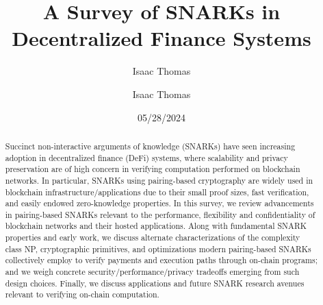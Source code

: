 \documentclass[envcountsame,runningheads,notitlepage]{llncs}
\title{A Survey of SNARKs in Decentralized Finance Systems}
\date{05/28/2024}
\author{
  Isaac Thomas\inst{1}
}%
\institute{Computer Science \& Engineering, UC San Diego\\
  \href{mailto:isthomas@ucsd.edu}{isthomas@ucsd.edu}
}  %
\author{Isaac Thomas}
\institute{University of California, San Diego}
\begin{document}
  \small  
  \maketitle

\begin{abstract}
Succinct non-interactive arguments of knowledge (SNARKs) have seen increasing adoption in decentralized finance (DeFi) systems, where scalability and privacy preservation are of high concern in verifying computation performed on blockchain networks. In particular, SNARKs using pairing-based cryptography are widely used in blockchain infrastructure/applications due to their small proof sizes, fast verification, and easily endowed zero-knowledge properties. In this survey, we review advancements in pairing-based SNARKs relevant to the performance, flexibility and confidentiality of blockchain networks and their hosted applications. Along with fundamental SNARK properties and early work, we discuss alternate characterizations of the complexity class NP, cryptographic primitives, and optimizations modern pairing-based SNARKs collectively employ to verify payments and execution paths through on-chain programs; and we weigh concrete security/performance/privacy tradeoffs emerging from such design choices. Finally, we discuss applications and future SNARK research avenues relevant to verifying on-chain computation.
\end{abstract}







\newpage
\ifnum{}
  
 \else
   
 \fi

\end{document}
